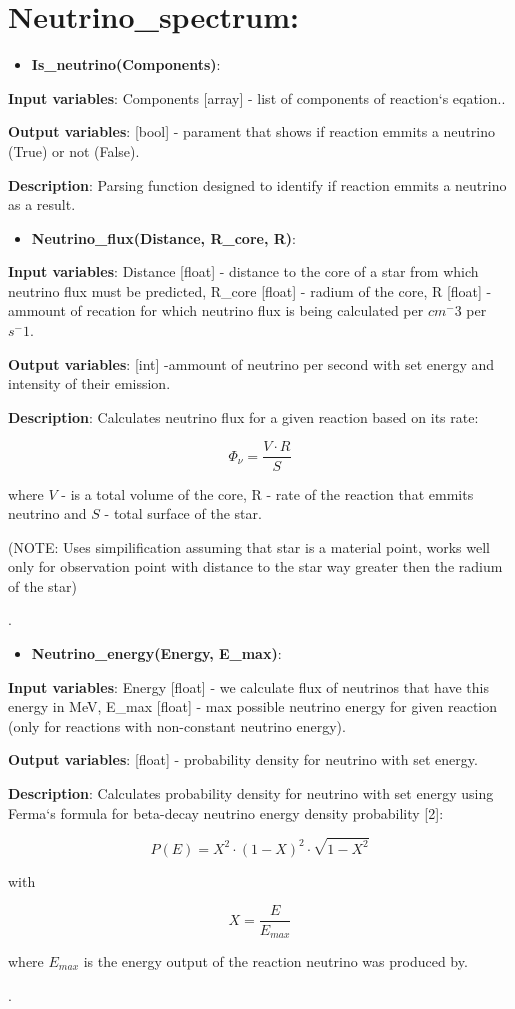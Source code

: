 \documentclass[a4paper,12pt]{article}
\newcommand{\namefunction}[4]{
  \begin{itemize}
    \item \textbf{#1}:
  \end{itemize}
  
  \textbf{Input variables}: #2.
  
  \textbf{Output variables}: #4.
  
  \textbf{Description}: #3.
}
\begin{document}
\section{Neutrino\_spectrum:}

\vspace{1em}

\namefunction{Is\_neutrino(Components)}{Components [array] - list of components of reaction`s eqation.}{Parsing function designed to identify if reaction emmits a neutrino as a result}{[bool] - parament that shows if reaction emmits a neutrino (True) or not (False)}

\vspace{1em}

\namefunction{Neutrino\_flux(Distance, R\_core, R)}{Distance [float] - distance to the core of a star from which neutrino flux must be predicted, R\_core [float] - radium of the core, R [float] - ammount of recation for which neutrino flux is being calculated per $cm^-3$ per $s^-1$}{Calculates neutrino flux for a given reaction based on its rate:

\[\Phi_\nu = \frac{V \cdot R}{S}\]

where $V$ - is a total volume of the core, R - rate of the reaction that emmits neutrino and $S$ - total surface of the star.

(NOTE: Uses simpilification assuming that star is a material point, works well only for observation point with distance to the star way greater then the radium of the star)

}{[int] -ammount of neutrino per second with set energy and intensity of their emission}

\vspace{1em}

\namefunction{Neutrino\_energy(Energy, E\_max)}{Energy [float] - we calculate flux of neutrinos that have this energy in MeV, E\_max [float] - max possible neutrino energy for given reaction (only for reactions with non-constant neutrino energy)}{Calculates probability density for neutrino with set energy using Ferma`s formula for beta-decay neutrino energy density probability [2]:

\[P(E) = X^{2} \cdot (1 - X)^{2} \cdot \sqrt{1 - X^{2}}\]

with

\[X = \frac{E}{E_{max}}\]

where $E_{max}$ is the energy output of the reaction neutrino was produced by.

}{[float] - probability density for neutrino with set energy}
\end{document}
